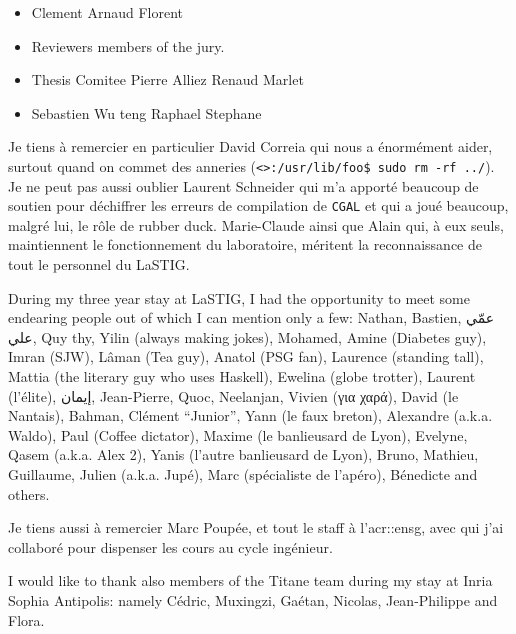 \begin{itemize}
    \item Clement Arnaud Florent
    \item Reviewers members of the jury.
    \item Thesis Comitee Pierre Alliez Renaud Marlet
    \item Sebastien Wu teng Raphael Stephane
\end{itemize}

Je tiens à remercier en particulier David Correia qui nous a énormément aider, surtout quand on commet des anneries (\verb!<>:/usr/lib/foo$ sudo rm -rf ../!).
Je ne peut pas aussi oublier Laurent Schneider qui m'a apporté beaucoup de soutien pour déchiffrer les erreurs de compilation de \verb!CGAL! et qui a joué beaucoup, malgré lui, le rôle de rubber duck.
Marie-Claude ainsi que Alain qui, à eux seuls, maintiennent le fonctionnement du laboratoire, méritent la reconnaissance de tout le personnel du LaSTIG.

During my three year stay at LaSTIG, I had the opportunity to meet some endearing people out of which I can mention only a few: Nathan, Bastien, \foreignlanguage{arabic}{عمّي علي}, Quy thy, Yilin (always making jokes), Mohamed, Amine (Diabetes guy), Imran (SJW), Lâman (Tea guy), Anatol (PSG fan), Laurence (standing tall), Mattia (the literary guy who uses Haskell), Ewelina (globe trotter), Laurent (l'élite), \foreignlanguage{arabic}{إيمان}, Jean-Pierre, Quoc, Neelanjan, Vivien (\foreignlanguage{greek}{για χαρά}), David (le Nantais), Bahman, Clément ``Junior'', Yann (le faux breton), Alexandre (a.k.a. Waldo), Paul (Coffee dictator), Maxime (le banlieusard de Lyon), Evelyne, Qasem (a.k.a. Alex 2), Yanis (l'autre banlieusard de Lyon), Bruno, Mathieu, Guillaume, Julien (a.k.a. Jupé), Marc (spécialiste de l'apéro), Bénedicte and others.

Je tiens aussi à remercier Marc Poupée, et tout le staff à l'\acrshort*{acr::ensg}, avec qui j'ai collaboré pour dispenser les cours au cycle ingénieur.

I would like to thank also members of the Titane team during my stay at Inria Sophia Antipolis: namely Cédric, Muxingzi, Gaétan, Nicolas, Jean-Philippe and Flora.


